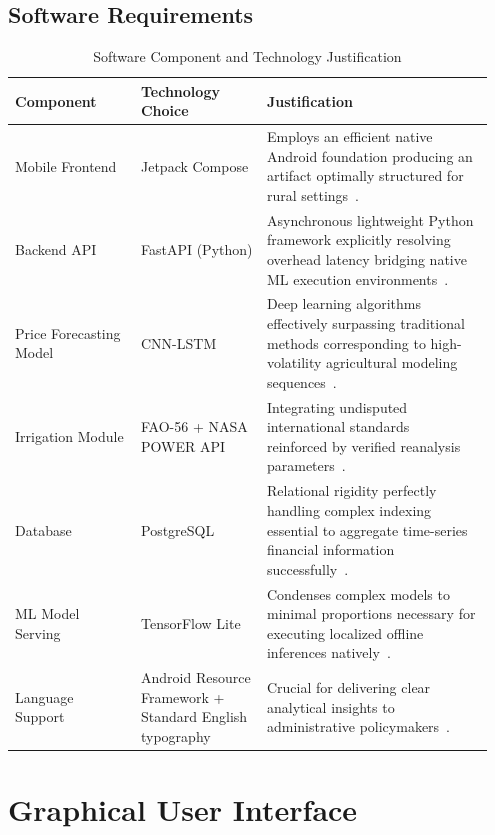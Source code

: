 \subsection{Software Requirements}

\begin{table}[htbp]
  \centering
  \caption{Software Component and Technology Justification}
  \label{tab:sw_requirements}
  \begin{tabular}{@{}p{0.25\linewidth} p{0.25\linewidth} p{0.45\linewidth}@{}}
    \toprule
    \textbf{Component} & \textbf{Technology Choice} & \textbf{Justification} \\
    \midrule
    Mobile Frontend & Jetpack Compose & Employs an efficient native Android foundation producing an artifact optimally structured for rural settings~\cite{khan2023cross}. \\
    Backend API & FastAPI (Python) & Asynchronous lightweight Python framework explicitly resolving overhead latency bridging native ML execution environments~\cite{patel2023fastapi}. \\
    Price Forecasting Model & CNN-LSTM & Deep learning algorithms effectively surpassing traditional methods corresponding to high-volatility agricultural modeling sequences~\cite{habib2021price, ahmed2022lstm}. \\
    Irrigation Module & FAO-56 + NASA POWER API & Integrating undisputed international standards~\cite{allen1998crop} reinforced by verified reanalysis parameters~\cite{silva2022nasapower}. \\
    Database & PostgreSQL & Relational rigidity perfectly handling complex indexing essential to aggregate time-series financial information successfully~\cite{singh2021agridb}. \\
    ML Model Serving & TensorFlow Lite & Condenses complex models to minimal proportions necessary for executing localized offline inferences natively~\cite{patel2023fastapi}. \\
    Language Support & Android Resource Framework + Standard English typography & Crucial for delivering clear analytical insights to administrative policymakers~\cite{raza2021urduui}. \\
    \bottomrule
  \end{tabular}
\end{table}

\section{Graphical User Interface}


